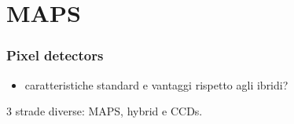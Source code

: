 \section{MAPS}

    \begin{frame}
        \frametitle{Pixel detectors}
        \begin{itemize}
            \item caratteristiche standard e vantaggi rispetto agli ibridi?
        \end{itemize}
        3 strade diverse: MAPS, hybrid e CCDs.
    \end{frame} 


